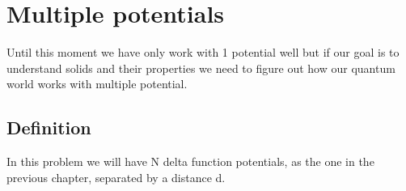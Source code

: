 
\setchapterpreamble[u]{\margintoc}
\chapter{Multiple potentials}

Until this moment we have only work with 1 potential well but if our goal is to understand solids and their properties we need to figure out how our quantum world works with multiple potential.


\section{Definition}

In this problem we will have N delta function potentials, as the one in the previous chapter, separated by a distance d.








